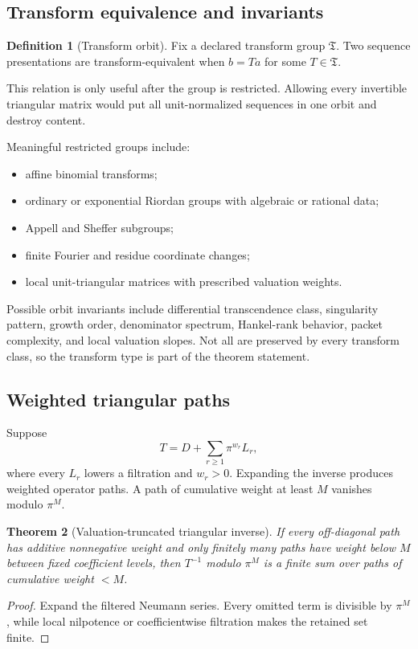 \documentclass[11pt]{article}
\newtheorem{theorem}{Theorem}[section]\newtheorem{proposition}[theorem]{Proposition}\newtheorem{lemma}[theorem]{Lemma}\newtheorem{corollary}[theorem]{Corollary}
\theoremstyle{definition}\newtheorem{definition}[theorem]{Definition}\newtheorem{example}[theorem]{Example}\newtheorem{construction}[theorem]{Construction}\newtheorem{algorithm}[theorem]{Algorithm}\newtheorem{conjecture}[theorem]{Conjecture}\newtheorem{problem}[theorem]{Problem}
\theoremstyle{remark}\newtheorem{remark}[theorem]{Remark}\newtheorem{boundary}[theorem]{Boundary}\newtheorem{certificate}[theorem]{Computational Certificate}\newtheorem{classical}[theorem]{Classical Input}\newtheorem{principle}[theorem]{Structural Principle}
\begin{document}
\subsection{Transform equivalence and invariants}
\begin{definition}[Transform orbit]
Fix a declared transform group $\mathfrak T$.  Two sequence presentations are transform-equivalent when $b=Ta$ for some $T\in\mathfrak T$.
\end{definition}
This relation is only useful after the group is restricted.  Allowing every invertible triangular matrix would put all unit-normalized sequences in one orbit and destroy content.

Meaningful restricted groups include:
\begin{itemize}
\item affine binomial transforms;
\item ordinary or exponential Riordan groups with algebraic or rational data;
\item Appell and Sheffer subgroups;
\item finite Fourier and residue coordinate changes;
\item local unit-triangular matrices with prescribed valuation weights.
\end{itemize}

Possible orbit invariants include differential transcendence class, singularity pattern, growth order, denominator spectrum, Hankel-rank behavior, packet complexity, and local valuation slopes.  Not all are preserved by every transform class, so the transform type is part of the theorem statement.

\subsection{Weighted triangular paths}
Suppose
\[
 T=D+\sum_{r\geq1}\pi^{w_r}L_r,
\]
where every $L_r$ lowers a filtration and $w_r>0$.  Expanding the inverse produces weighted operator paths.  A path of cumulative weight at least $M$ vanishes modulo $\pi^M$.

\begin{theorem}[Valuation-truncated triangular inverse]
If every off-diagonal path has additive nonnegative weight and only finitely many paths have weight below $M$ between fixed coefficient levels, then $T^{-1}$ modulo $\pi^M$ is a finite sum over paths of cumulative weight $<M$.
\end{theorem}
\begin{proof}
Expand the filtered Neumann series.  Every omitted term is divisible by $\pi^M$, while local nilpotence or coefficientwise filtration makes the retained set finite.
\end{proof}
\end{document}
